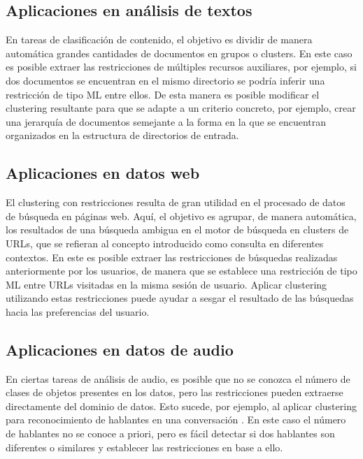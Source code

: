 \subsection{Aplicaciones en análisis de textos}

En tareas de clasificación de contenido, el objetivo es dividir de manera automática grandes cantidades de documentos en grupos o clusters. En este caso es posible extraer las restricciones de múltiples recursos auxiliares, por ejemplo, si dos documentos se encuentran en el mismo directorio se podría inferir una restricción de tipo \acf{ML} entre ellos. De esta manera es posible modificar el clustering resultante para que se adapte a un criterio concreto, por ejemplo, crear una jerarquía de documentos semejante a la forma en la que se encuentran organizados en la estructura de directorios de entrada.

\subsection{Aplicaciones en datos web} 

El clustering con restricciones resulta de gran utilidad en el procesado de datos de búsqueda en páginas web. Aquí, el objetivo es agrupar, de manera automática, los resultados de una búsqueda ambigua en el motor de búsqueda en clusters de \acs{URL}s, que se refieran al concepto introducido como consulta en diferentes contextos. En este es posible extraer las restricciones de búsquedas realizadas anteriormente por los usuarios, de manera que se establece una restricción de tipo \acf{ML} entre \acs{URL}s visitadas en la misma sesión de usuario. Aplicar clustering utilizando estas restricciones puede ayudar a sesgar el resultado de las búsquedas hacia las preferencias del usuario.

\subsection{Aplicaciones en datos de audio}

En ciertas tareas de análisis de audio, es posible que no se conozca el número de clases de objetos presentes en los datos, pero las restricciones pueden extraerse directamente del dominio de datos. Esto sucede, por ejemplo, al aplicar clustering para reconocimiento de hablantes en una conversación \cite{BarHillel:2003}. En este caso el número de hablantes no se conoce a priori, pero es fácil detectar si dos hablantes son diferentes o similares y establecer las restricciones en base a ello.

